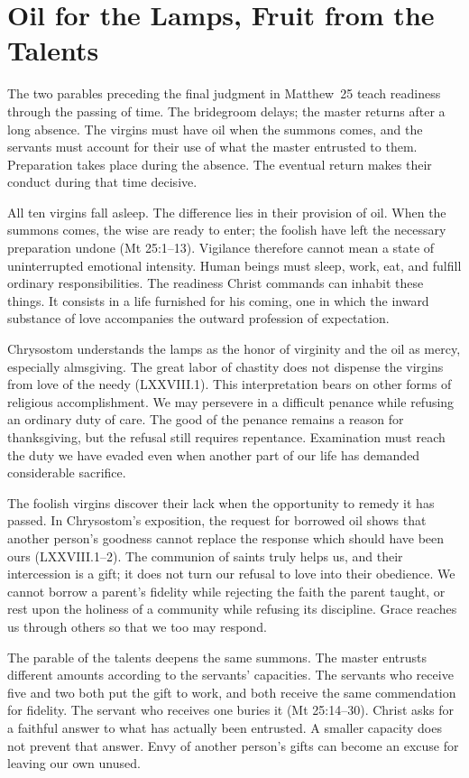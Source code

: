\section{Oil for the Lamps, Fruit from the Talents}

The two parables preceding the final judgment in Matthew~25 teach readiness through the passing of time. The bridegroom delays; the master returns after a long absence. The virgins must have oil when the summons comes, and the servants must account for their use of what the master entrusted to them. Preparation takes place during the absence. The eventual return makes their conduct during that time decisive.

All ten virgins fall asleep. The difference lies in their provision of oil. When the summons comes, the wise are ready to enter; the foolish have left the necessary preparation undone (Mt 25:1--13). Vigilance therefore cannot mean a state of uninterrupted emotional intensity. Human beings must sleep, work, eat, and fulfill ordinary responsibilities. The readiness Christ commands can inhabit these things. It consists in a life furnished for his coming, one in which the inward substance of love accompanies the outward profession of expectation.

Chrysostom understands the lamps as the honor of virginity and the oil as mercy, especially almsgiving. The great labor of chastity does not dispense the virgins from love of the needy (LXXVIII.1). This interpretation bears on other forms of religious accomplishment. We may persevere in a difficult penance while refusing an ordinary duty of care. The good of the penance remains a reason for thanksgiving, but the refusal still requires repentance. Examination must reach the duty we have evaded even when another part of our life has demanded considerable sacrifice.

The foolish virgins discover their lack when the opportunity to remedy it has passed. In Chrysostom's exposition, the request for borrowed oil shows that another person's goodness cannot replace the response which should have been ours (LXXVIII.1--2). The communion of saints truly helps us, and their intercession is a gift; it does not turn our refusal to love into their obedience. We cannot borrow a parent's fidelity while rejecting the faith the parent taught, or rest upon the holiness of a community while refusing its discipline. Grace reaches us through others so that we too may respond.

The parable of the talents deepens the same summons. The master entrusts different amounts according to the servants' capacities. The servants who receive five and two both put the gift to work, and both receive the same commendation for fidelity. The servant who receives one buries it (Mt 25:14--30). Christ asks for a faithful answer to what has actually been entrusted. A smaller capacity does not prevent that answer. Envy of another person's gifts can become an excuse for leaving our own unused.

